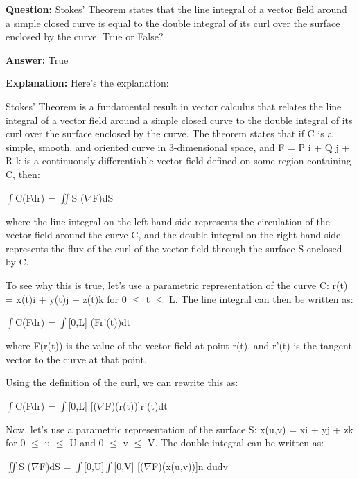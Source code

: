\documentclass{article}
\begin{document}
            
                \textbf {Question:} Stokes' Theorem states that the line integral of a vector field around a simple closed curve is equal to the double integral of its curl over the surface enclosed by the curve. True or False?
                
                \textbf{Answer:} True

                \textbf{Explanation:} Here's the explanation:

Stokes' Theorem is a fundamental result in vector calculus that relates the line integral of a vector field around a simple closed curve to the double integral of its curl over the surface enclosed by the curve. The theorem states that if C is a simple, smooth, and oriented curve in 3-dimensional space, and F = P i + Q j + R k is a continuously differentiable vector field defined on some region containing C, then:

\ensuremath{\int}C(F{\textperiodcentered}dr) = \ensuremath{\iint}S (\ensuremath{\nabla}{\texttimes}F){\textperiodcentered}dS

where the line integral on the left-hand side represents the circulation of the vector field around the curve C, and the double integral on the right-hand side represents the flux of the curl of the vector field through the surface S enclosed by C.

To see why this is true, let's use a parametric representation of the curve C: r(t) = x(t)i + y(t)j + z(t)k for 0 \ensuremath{\leq} t \ensuremath{\leq} L. The line integral can then be written as:

\ensuremath{\int}C(F{\textperiodcentered}dr) = \ensuremath{\int}[0,L] (F{\textperiodcentered}r'(t))dt

where F(r(t)) is the value of the vector field at point r(t), and r'(t) is the tangent vector to the curve at that point.

Using the definition of the curl, we can rewrite this as:

\ensuremath{\int}C(F{\textperiodcentered}dr) = \ensuremath{\int}[0,L] [(\ensuremath{\nabla}{\texttimes}F)(r(t))]{\textperiodcentered}r'(t)dt

Now, let's use a parametric representation of the surface S: x(u,v) = xi + yj + zk for 0 \ensuremath{\leq} u \ensuremath{\leq} U and 0 \ensuremath{\leq} v \ensuremath{\leq} V. The double integral can be written as:

\ensuremath{\iint}S (\ensuremath{\nabla}{\texttimes}F){\textperiodcentered}dS = \ensuremath{\int}[0,U]\ensuremath{\int}[0,V] [(\ensuremath{\nabla}{\texttimes}F)(x(u,v))]{\textperiodcentered}n dudv
\end{document}
